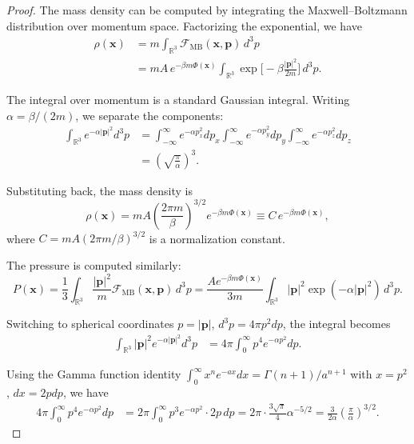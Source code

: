 \documentclass[12pt,a4paper]{article}
\numberwithin{equation}{section}
\begin{document}
\begin{proof}
The mass density can be computed by integrating the Maxwell--Boltzmann distribution over momentum space. Factorizing the exponential, we have
\begin{align}
\rho(\mathbf{x}) &= m \int_{\mathbb{R}^3} \mathcal{F}_{\mathrm{MB}}(\mathbf{x},\mathbf{p}) \, d^3p \\
&= m A \, e^{-\beta m \Phi(\mathbf{x})} \int_{\mathbb{R}^3} \exp\Big[- \beta \frac{|\mathbf{p}|^2}{2m} \Big] \, d^3p.
\end{align}

The integral over momentum is a standard Gaussian integral. Writing $\alpha = \beta/(2m)$, we separate the components:
\begin{align}
\int_{\mathbb{R}^3} e^{-\alpha |\mathbf{p}|^2} d^3p &= \int_{-\infty}^{\infty} e^{-\alpha p_x^2} dp_x \int_{-\infty}^{\infty} e^{-\alpha p_y^2} dp_y \int_{-\infty}^{\infty} e^{-\alpha p_z^2} dp_z \\
&= \left( \sqrt{\frac{\pi}{\alpha}} \right)^3.
\end{align}

Substituting back, the mass density is
\begin{equation}
\rho(\mathbf{x}) = m A \left( \frac{2 \pi m}{\beta} \right)^{3/2} e^{-\beta m \Phi(\mathbf{x})} \equiv C \, e^{-\beta m \Phi(\mathbf{x})},
\end{equation}
where $C = m A (2 \pi m / \beta)^{3/2}$ is a normalization constant.

The pressure is computed similarly:
\begin{equation}
P(\mathbf{x}) = \frac{1}{3} \int_{\mathbb{R}^3} \frac{|\mathbf{p}|^2}{m} \mathcal{F}_{\mathrm{MB}}(\mathbf{x},\mathbf{p}) \, d^3 p
= \frac{A e^{-\beta m \Phi(\mathbf{x})}}{3 m} \int_{\mathbb{R}^3} |\mathbf{p}|^2 \exp(-\alpha |\mathbf{p}|^2) \, d^3p.
\end{equation}

Switching to spherical coordinates $p = |\mathbf{p}|$, $d^3p = 4 \pi p^2 dp$, the integral becomes
\begin{align}
\int_{\mathbb{R}^3} |\mathbf{p}|^2 e^{-\alpha |\mathbf{p}|^2} d^3p &= 4 \pi \int_0^\infty p^4 e^{-\alpha p^2} dp.
\end{align}

Using the Gamma function identity $\int_0^\infty x^{n} e^{-a x} dx = \Gamma(n+1) / a^{n+1}$ with $x = p^2$, $dx = 2p dp$, we have
\begin{align}
4 \pi \int_0^\infty p^4 e^{-\alpha p^2} dp &= 2 \pi \int_0^\infty p^3 e^{-\alpha p^2} \cdot 2p \, dp = 2 \pi \cdot \frac{3 \sqrt{\pi}}{4} \alpha^{-5/2} = \frac{3}{2 \alpha} \left( \frac{\pi}{\alpha} \right)^{3/2}.
\end{align}


\end{proof}
\end{document}
